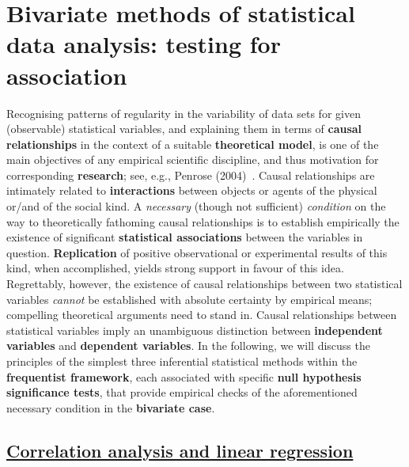 \chapter[Bivariate methods of statistical data analysis]{Bivariate
methods of statistical data analysis: testing for association}
Recognising patterns of regularity in the variability of data sets 
for given (observable) statistical variables, and explaining them 
in terms of \textbf{causal relationships} in the context of a 
suitable \textbf{theoretical model}, is one of the main objectives
of any empirical scientific discipline, and thus motivation for 
corresponding \textbf{research}; see, e.g., Penrose 
(2004)~. Causal relationships are intimately related 
to \textbf{interactions} between objects or agents of the physical 
or/and of the social kind. A \textit{necessary} (though not 
sufficient) \textit{condition} on the way to theoretically
fathoming causal relationships is to establish empirically the
existence of significant \textbf{statistical associations} between
the variables in question. \textbf{Replication} of positive
observational or experimental results of this kind, when
accomplished, yields strong support in favour of this idea.
Regrettably, however, the existence of causal relationships between
two statistical variables \textit{cannot} be established with
absolute certainty by empirical means; compelling theoretical
arguments need to stand in. Causal relationships between
statistical variables imply an unambiguous distinction between
\textbf{independent variables} and \textbf{dependent variables}. In
the following, we will discuss the principles of the simplest three inferential statistical methods within the \textbf{frequentist
framework}, each associated with specific \textbf{null hypothesis
significance tests}, that provide empirical checks of the
aforementioned necessary condition in the \textbf{bivariate case}.

\section[Correlation analysis and linear regression]{\href{https://www.youtube.com/watch?v=aLcTqycIXgU}{Correlation analysis and
linear regression}}
